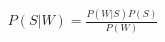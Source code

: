 \documentclass[preview]{standalone}
\begin{document}
\begin{align*}
P(S|W) = \frac{P(W|S)P(S)}{P(W)}
\end{align*}
\end{document}
